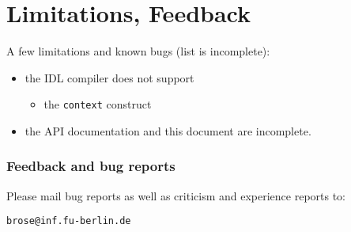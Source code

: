 \documentclass[12pt]{scrbook}
\begin{document}


\chapter{Limitations, Feedback}

A few limitations and known bugs (list is incomplete):

\begin{itemize}
    \item the IDL compiler does not support 
    \begin{itemize}
        \item the {\tt context} construct
    \end{itemize}
    \item the API documentation and this document are incomplete.
\end{itemize}

\subsection*{Feedback and bug reports}

Please mail bug reports as well as criticism and experience reports to:

\verb+brose@inf.fu-berlin.de+

{


}
\end{document}
